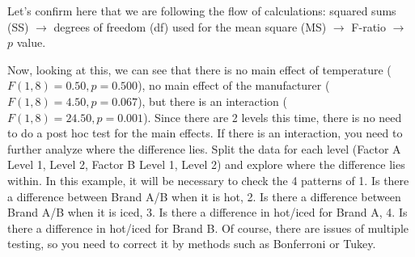 \documentclass{ltjbook}
\begin{document}


Let's confirm here that we are following the flow of calculations: squared sums (SS) $\to$ degrees of freedom (df) used for the mean square (MS) $\to$ F-ratio $\to$ $p$ value.

Now, looking at this, we can see that there is no main effect of temperature ($F(1,8)=0.50,p=0.500$), no main effect of the manufacturer ($F(1,8)=4.50,p=0.067$), but there is an interaction ($F(1,8)=24.50,p=0.001$). Since there are 2 levels this time, there is no need to do a post hoc test for the main effects. If there is an interaction, you need to further analyze where the difference lies. Split the data for each level (Factor A Level 1, Level 2, Factor B Level 1, Level 2) and explore where the difference lies within. In this example, it will be necessary to check the 4 patterns of 1. Is there a difference between Brand A/B when it is hot, 2. Is there a difference between Brand A/B when it is iced, 3. Is there a difference in hot/iced for Brand A, 4. Is there a difference in hot/iced for Brand B. Of course, there are issues of multiple testing, so you need to correct it by methods such as Bonferroni or Tukey.
\end{document}
